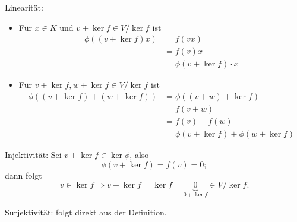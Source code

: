  		Linearität:
 		\begin{itemize}
 			\item Für $ x\in K $ und $ v+\ker f \in V/\ker f $ ist
 			      \begin{align*}
 			      	\phi( (v+\ker f)x) & = f(vx)                  \\
 			      	                   & = f(v)x                  \\
 			      	                   & = \phi (v+\ker f)\cdot x
 			      \end{align*}
 			\item Für $ v+\ker f, w+\ker f\in V/\ker f $ ist
 			      \begin{align*}
 			      	\phi ((v+\ker f)+(w+\ker f) ) & = \phi((v+w)+\ker f)           \\
 			      	                              & =f(v+w)                        \\
 			      	                              & = f(v)+f(w)                    \\
 			      	                              & =\phi(v+\ker f)+\phi(w+\ker f)
 			      \end{align*}
 		\end{itemize}
 		Injektivität:
 		Sei $ v+\ker f\in \ker \phi $, also
 		\[
 			\phi(v+\ker f)= f(v) = 0;
 		\]
 		dann folgt
 		\[
 			v\in \ker f \Rightarrow v+\ker f = \ker f = \underbrace{0}_{0+\ker f}\in V/\ker f.
 		\]

 		Surjektivität:
 		folgt direkt aus der Definition.
